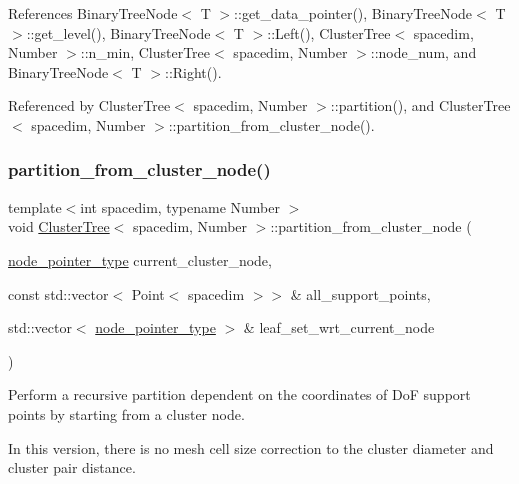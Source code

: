 References Binary\+Tree\+Node$<$ T $>$\+::get\+\_\+data\+\_\+pointer(), Binary\+Tree\+Node$<$ T $>$\+::get\+\_\+level(), Binary\+Tree\+Node$<$ T $>$\+::\+Left(), Cluster\+Tree$<$ spacedim, Number $>$\+::n\+\_\+min, Cluster\+Tree$<$ spacedim, Number $>$\+::node\+\_\+num, and Binary\+Tree\+Node$<$ T $>$\+::\+Right().



Referenced by Cluster\+Tree$<$ spacedim, Number $>$\+::partition(), and Cluster\+Tree$<$ spacedim, Number $>$\+::partition\+\_\+from\+\_\+cluster\+\_\+node().

\mbox{\label{classClusterTree_a6d3636b1686d72909611a6d516f5ee47}} 
\subsubsection{\texorpdfstring{partition\+\_\+from\+\_\+cluster\+\_\+node()}{partition\_from\_cluster\_node()}\hspace{0.1cm}{\footnotesize\ttfamily [2/3]}}
{\footnotesize\ttfamily template$<$int spacedim, typename Number $>$ \\
void \hyperlink{classClusterTree}{Cluster\+Tree}$<$ spacedim, Number $>$\+::partition\+\_\+from\+\_\+cluster\+\_\+node (\begin{DoxyParamCaption}\item[{\hyperlink{classClusterTree_ae4bb0fdc7ac559d7844d04a00ab3e9de}{node\+\_\+pointer\+\_\+type}}]{current\+\_\+cluster\+\_\+node,  }\item[{const std\+::vector$<$ Point$<$ spacedim $>$$>$ \&}]{all\+\_\+support\+\_\+points,  }\item[{std\+::vector$<$ \hyperlink{classClusterTree_ae4bb0fdc7ac559d7844d04a00ab3e9de}{node\+\_\+pointer\+\_\+type} $>$ \&}]{leaf\+\_\+set\+\_\+wrt\+\_\+current\+\_\+node }\end{DoxyParamCaption})\hspace{0.3cm}{\ttfamily [private]}}

Perform a recursive partition dependent on the coordinates of DoF support points by starting from a cluster node.

In this version, there is no mesh cell size correction to the cluster diameter and cluster pair distance.


